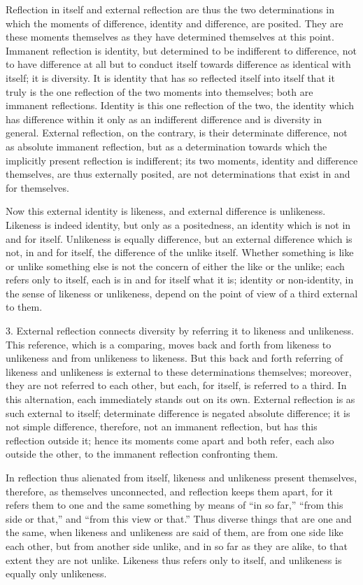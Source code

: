 Reflection in itself and external reflection are
thus the two determinations
in which the moments of difference,
identity and difference, are posited.
They are these moments themselves
as they have determined themselves at this point.
Immanent reflection is identity,
but determined to be indifferent to difference,
not to have difference at all but to conduct
itself towards difference as identical with itself;
it is diversity.
It is identity that has so reflected itself into itself
that it truly is the one reflection of
the two moments into themselves;
both are immanent reflections.
Identity is this one reflection of the two,
the identity which has difference within it
only as an indifferent difference
and is diversity in general.
External reflection, on the contrary,
is their determinate difference,
not as absolute immanent reflection,
but as a determination towards which
the implicitly present reflection is indifferent;
its two moments, identity and difference themselves,
are thus externally posited,
are not determinations that
exist in and for themselves.

Now this external identity is likeness,
and external difference is unlikeness.
Likeness is indeed identity,
but only as a positedness,
an identity which is not in and for itself.
Unlikeness is equally difference,
but an external difference which is not, in and for itself,
the difference of the unlike itself.
Whether something is like or unlike something else is
not the concern of either the like or the unlike;
each refers only to itself, each is in and for itself what it is;
identity or non-identity, in the sense of likeness or unlikeness,
depend on the point of view of a third external to them.

3. External reflection connects diversity by
referring it to likeness and unlikeness.
This reference, which is a comparing,
moves back and forth from likeness
to unlikeness and from unlikeness to likeness.
But this back and forth referring of
likeness and unlikeness is
external to these determinations themselves;
moreover, they are not referred to each other,
but each, for itself, is referred to a third.
In this alternation,
each immediately stands out on its own.
External reflection is as such external to itself;
determinate difference is negated absolute difference;
it is not simple difference, therefore,
not an immanent reflection,
but has this reflection outside it;
hence its moments come apart
and both refer,
each also outside the other,
to the immanent reflection
confronting them.

In reflection thus alienated from itself,
likeness and unlikeness present themselves,
therefore, as themselves unconnected,
and reflection keeps them apart,
for it refers them to one and the same
something by means of “in so far,”
“from this side or that,”
and “from this view or that.”
Thus diverse things that are one and the same,
when likeness and unlikeness are said of them,
are from one side like each other,
but from another side unlike,
and in so far as they are alike,
to that extent they are not unlike.
Likeness thus refers only to itself,
and unlikeness is equally only unlikeness.

